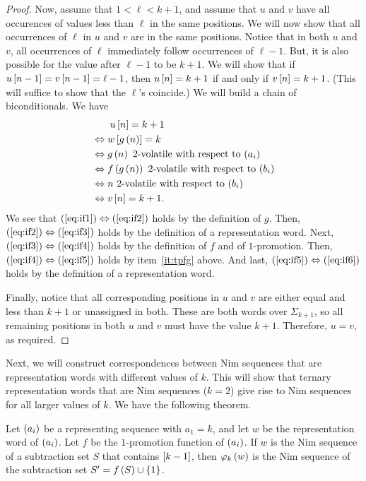 \documentclass[english,12pt]{article}
\newcommand{\seq}{\p}
\begin{document}
\begin{proof}
Now, assume that $1<\ell<k+1$, and assume that $u$ and $v$ have all occurences of values less than $\ell$ in the same positions.  We will now show that all occurrences of $\ell$ in $u$ and $v$ are in the same positions.  Notice that in both $u$ and $v$, all occurrences of $\ell$ immediately follow occurrences of $\ell-1$.  But, it is also possible for the value after $\ell-1$ to be $k+1$.  We will show that if $u\left[n-1\right]=v\left[n-1\right]=\ell-1$, then $u\left[n\right]=k+1$ if and only if $v\left[n\right]=k+1$.  (This will suffice to show that the $\ell$'s coincide.)  We will build a chain of biconditionals.  We have
\begin{align}
\label{eq:if1}&\hspace{0.25in}u\bk{n}=k+1\\
\label{eq:if2}&\iff w\bk{g\p{n}}=k\\
\label{eq:if3}&\iff g\p{n}\text{ $2$-volatile with respect to $\seq{a_i}$}\\
\label{eq:if4}&\iff f\p{g\p{n}}\text{ $2$-volatile with respect to $\seq{b_i}$}\\
\label{eq:if5}&\iff n\text{ $2$-volatile with respect to $\seq{b_i}$}\\
\label{eq:if6}&\iff v\bk{n}=k+1.
\end{align}
We see that $\left(\ref{eq:if1}\right)\Leftrightarrow\left(\ref{eq:if2}\right)$ holds by the definition of $g$.  Then, $\left(\ref{eq:if2}\right)\Leftrightarrow\left(\ref{eq:if3}\right)$ holds by the definition of a representation word.  Next, $\left(\ref{eq:if3}\right)\Leftrightarrow\left(\ref{eq:if4}\right)$ holds by the definition of $f$ and of $1$-promotion.  Then, $\left(\ref{eq:if4}\right)\Leftrightarrow\left(\ref{eq:if5}\right)$ holds by item~\ref{it:tpfg} above.  And last, $\left(\ref{eq:if5}\right)\Leftrightarrow\left(\ref{eq:if6}\right)$ holds by the definition of a representation word.

Finally, notice that all corresponding positions in $u$ and $v$ are either equal and less than $k+1$ or unassigned in both.  These are both words over $\Sigma_{k+1}$, so all remaining positions in both $u$ and $v$ must have the value $k+1$.  Therefore, $u=v$, as required.
\end{proof}
Next, we will construct correspondences between Nim sequences that are representation words with different values of $k$.  This will show that ternary representation words that are Nim sequences ($k=2$) give rise to Nim sequences for all larger values of $k$.
We have the following theorem.
\begin{theorem}\label{thm:teruniv}
Let $\seq{a_i}$ be a representing sequence with $a_1=k$, and let $w$ be the representation word of $\seq{a_i}$.  Let $f$ be the $1$-promotion function of $\seq{a_i}$.  If $w$ is the Nim sequence of a subtraction set $S$ that contains $\left[k-1\right]$, then $\varphi_k\left(w\right)$ is the Nim sequence of the subtraction set $S'=f\left(S\right)\cup\left\{1\right\}$.
\end{theorem}
\end{document}
